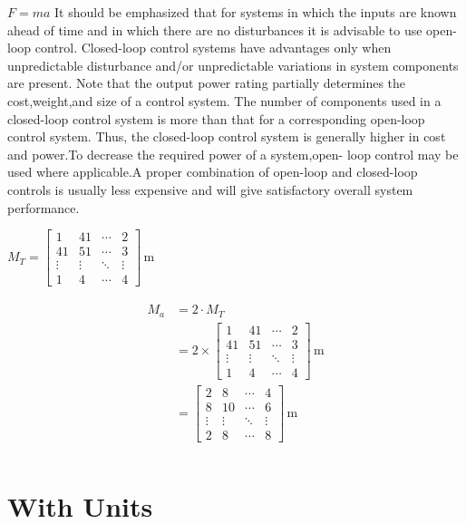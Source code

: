 \documentclass{report}
\begin{document}
$F = ma$ It should be emphasized that for systems in which the inputs are known ahead of time and in which there are no disturbances it is advisable to use open-loop control.  Closed-loop control systems have advantages only when unpredictable disturbance  and/or unpredictable variations in system components are present. Note that the  output power rating partially determines the cost,weight,and size of a control system.  The number of components used in a closed-loop control system is more than that for  a corresponding open-loop control system. Thus, the closed-loop control system is generally higher in cost and power.To decrease the required power of a system,open-  loop control may be used where applicable.A proper combination of open-loop and  closed-loop controls is usually less expensive and will give satisfactory overall system  performance.

$M_{T} = \left[\begin{matrix}1 & 4 1 & \cdots & 2\\4 1 & 5 1 & \cdots & 3\\\vdots & \vdots & \ddots & \vdots\\1 & 4 & \cdots & 4\end{matrix}\right]\,\mathrm{m}$ 

\begin{align}
\begin{split}
M_{a}	&= 2 \cdot M_{T}\\
		&= 2 \times \left[\begin{matrix}1 & 4 1 & \cdots & 2\\4 1 & 5 1 & \cdots & 3\\\vdots & \vdots & \ddots & \vdots\\1 & 4 & \cdots & 4\end{matrix}\right]\,\mathrm{m}\\
		&= \left[\begin{matrix}2 & 8 & \cdots & 4\\8 & 10 & \cdots & 6\\\vdots & \vdots & \ddots & \vdots\\2 & 8 & \cdots & 8\end{matrix}\right]\,\mathrm{m}\\
\end{split}
\end{align}

\section{With Units}
\end{document}
